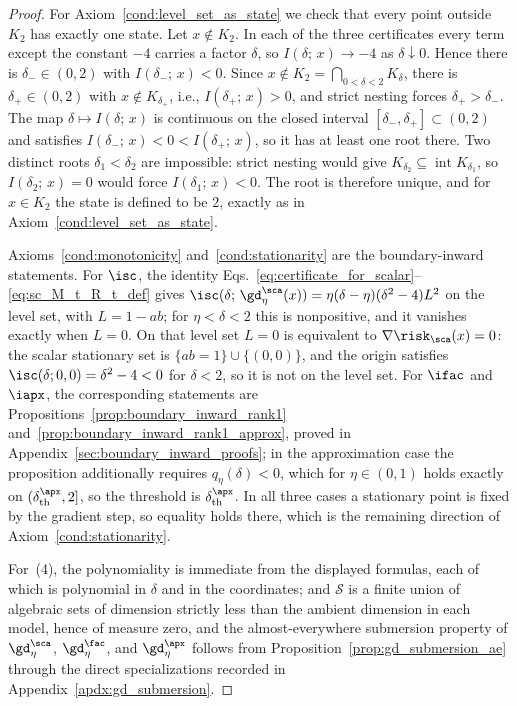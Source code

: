 \documentclass{article}
\begin{document}
\begin{proof}
For Axiom~\ref{cond:level_set_as_state} we check that every point outside $K_2$
has exactly one state. Let $x\notin K_2$. In each of the three
certificates every term except the constant $-4$ carries a factor $\delta$, so
$I(\delta;\,x)\to-4$ as $\delta\downarrow0$. Hence there is
$\delta_-\in(0,2)$ with $I(\delta_-;\,x)<0$.
Since
$x\notin K_2=\bigcap_{0<\delta<2}K_\delta$, there is
$\delta_+\in(0,2)$ with $x \notin K_{\delta_+}$, i.e.,  $I(\delta_+;\,x)>0$, and strict nesting forces $\delta_+>\delta_-$. The map
$\delta\mapsto I(\delta;\,x)$ is continuous on the closed interval
$[\delta_-,\delta_+]\subset(0,2)$ and satisfies $I(\delta_-;\,x)<0<I(\delta_+;\,x)$,
so it has at least one root there. Two distinct
roots $\delta_1<\delta_2$ are impossible: strict nesting would give
$K_{\delta_2}\subseteq\operatorname{int}K_{\delta_1}$, so
$I(\delta_2;\,x)=0$ would force $I(\delta_1;\,x)<0$. The root is therefore
unique, and for $x\in K_2$ the state is defined to be $2$, exactly as in
Axiom~\ref{cond:level_set_as_state}.

Axioms~\ref{cond:monotonicity} and~\ref{cond:stationarity} are the
boundary-inward statements. For $\isc$, the identity
Eqs.~\eqref{eq:certificate_for_scalar}--\eqref{eq:sc_M_t_R_t_def} gives
$\isc(\delta;\,\gd_\eta^\sca(x))=\eta(\delta-\eta)(\delta^2-4)L^2$
on the level set, with $L=1-ab$; for $\eta<\delta<2$ this is nonpositive, and
it vanishes exactly when $L=0$. On that level set $L=0$ is equivalent to
$\nabla\risk_\sca(x)=0$: the scalar stationary set is
$\{ab=1\}\cup\{(0,0)\}$, and the origin satisfies $\isc(\delta;0,0)=\delta^2-4<0$
for $\delta<2$, so it is not on the level set. For $\ifac$ and
$\iapx$, the corresponding statements are
Propositions~\ref{prop:boundary_inward_rank1}
and~\ref{prop:boundary_inward_rank1_approx}, proved in
Appendix~\ref{sec:boundary_inward_proofs}; in the approximation case the
proposition additionally requires $q_\eta(\delta)<0$, which for
$\eta\in(0,1)$ holds exactly on $(\delta_\mathrm{th}^\apx,2]$, so the
threshold is $\delta_\mathrm{th}^\apx$. In all three cases a stationary point
is fixed by the gradient step, so equality holds there, which is the remaining
direction of Axiom~\ref{cond:stationarity}.

For~(4), the polynomiality is immediate from the displayed formulas, each of
which is polynomial in $\delta$ and in the coordinates; and $\mathcal S$ is a
finite union of algebraic sets of dimension strictly less than the ambient
dimension in each model, hence of measure zero, and the almost-everywhere
submersion property of $\gd_\eta^\sca$, $\gd_\eta^\fac$, and $\gd_\eta^\apx$
follows from Proposition~\ref{prop:gd_submersion_ae} through the direct
specializations recorded in Appendix~\ref{apdx:gd_submersion}.
\end{proof}
\end{document}
